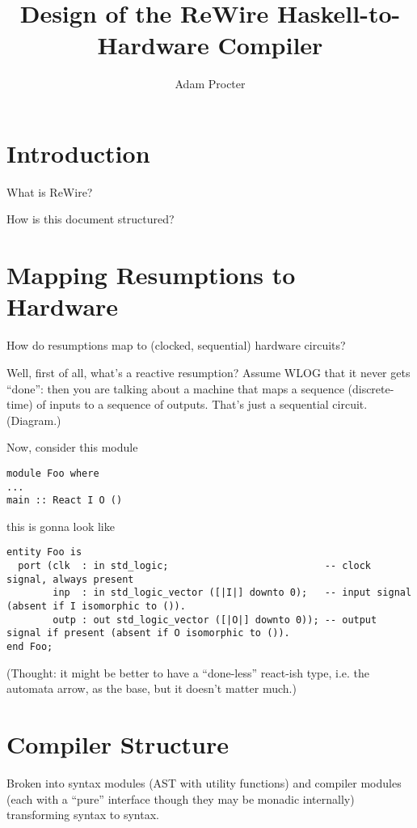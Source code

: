 \documentclass{article}[12pt]
\begin{document}
\title{Design of the ReWire Haskell-to-Hardware Compiler}
\author{Adam Procter}

\maketitle

\section{Introduction}\label{section:introduction}

What is ReWire?

How is this document structured?

\section{Mapping Resumptions to Hardware}

How do resumptions map to (clocked, sequential) hardware circuits?

Well, first of all, what's a reactive resumption? Assume WLOG that it never gets ``done'': then you are talking about a machine that maps a sequence (discrete-time) of inputs to a sequence of outputs. That's just a sequential circuit. (Diagram.)

Now, consider this module

\begin{verbatim}
module Foo where
...
main :: React I O ()
\end{verbatim}

this is gonna look like

\begin{verbatim}
entity Foo is
  port (clk  : in std_logic;                           -- clock signal, always present
        inp  : in std_logic_vector ([|I|] downto 0);   -- input signal (absent if I isomorphic to ()).
        outp : out std_logic_vector ([|O|] downto 0)); -- output signal if present (absent if O isomorphic to ()).
end Foo;
\end{verbatim}

(Thought: it might be better to have a ``done-less'' react-ish type, i.e. the automata arrow, as the base, but it doesn't matter much.)

\section{Compiler Structure}

Broken into syntax modules (AST with utility functions) and compiler modules (each with a ``pure'' interface though they may be monadic internally) transforming syntax to syntax.
\end{document}
